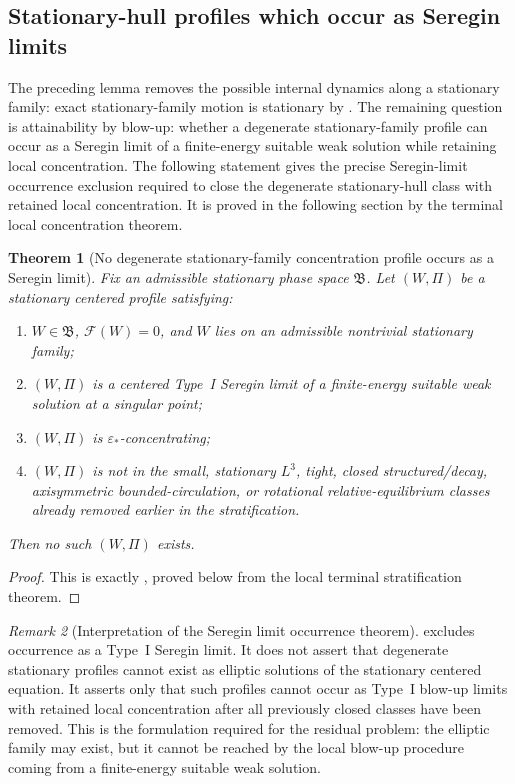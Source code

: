 \documentclass[11pt]{amsart}
\numberwithin{equation}{section}
\theoremstyle{plain}
\newtheorem{theorem}{Theorem}[section]
\theoremstyle{definition}
\theoremstyle{remark}
\newtheorem{remark}[theorem]{Remark}
\begin{document}
\subsection{Stationary-hull profiles which occur as Seregin limits}

The preceding lemma removes the possible internal dynamics along a stationary
family: exact stationary-family motion is stationary by
.  The remaining question is
attainability by blow-up: whether a degenerate stationary-family profile can
occur as a Seregin limit of a finite-energy suitable weak solution while
retaining local concentration.  The following statement gives the precise
Seregin-limit occurrence exclusion
required to close the degenerate stationary-hull class with retained local
concentration.  It is proved in the following section by the terminal local
concentration theorem.

\begin{theorem}[No degenerate stationary-family concentration profile occurs as a Seregin limit]
\label{thm:R3-no-attainable-degenerate-family}
Fix an admissible stationary phase space \(\mathfrak B\).  Let \((W,\Pi)\) be a
stationary centered profile satisfying:
\begin{enumerate}[label=(\roman*)]
   \item \(W\in\mathfrak B\), \(\mathcal F(W)=0\), and \(W\) lies on an
      admissible nontrivial stationary family;
   \item \((W,\Pi)\) is a centered Type~I Seregin limit of a finite-energy
      suitable weak solution at a singular point;
   \item \((W,\Pi)\) is \(\varepsilon_*\)-concentrating;
   \item \((W,\Pi)\) is not in the small, stationary \(L^3\), tight, closed
      structured/decay, axisymmetric bounded-circulation, or rotational
      relative-equilibrium classes already removed earlier in the stratification.
\end{enumerate}
Then no such \((W,\Pi)\) exists.
\end{theorem}

\begin{proof}
This is exactly , proved below from
the local terminal stratification theorem.
\end{proof}

\begin{remark}[Interpretation of the Seregin limit occurrence theorem]
\label{rem:R3-input-interpretation}
 excludes occurrence
as a Type~I Seregin limit.  It does not assert that degenerate stationary profiles cannot
exist as elliptic solutions of the stationary centered equation.  It asserts
only that such profiles cannot occur as Type~I blow-up limits with retained
local concentration after all previously closed classes have been removed.  This
is the formulation required for the residual problem: the elliptic family may
exist, but it cannot be reached by the local blow-up procedure coming from a
finite-energy suitable weak solution.
\end{remark}
\end{document}
